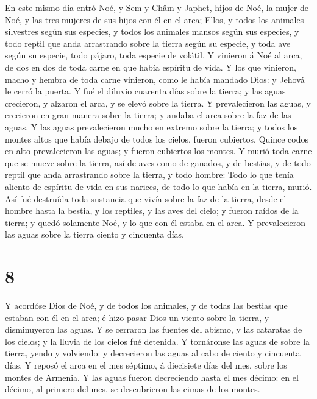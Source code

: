  En este mismo día entró Noé, y Sem y Châm y Japhet, hijos
de Noé, la mujer de Noé, y las tres mujeres de sus hijos con él en el
arca;  Ellos, y todos los animales silvestres según sus
especies, y todos los animales mansos según sus especies, y todo reptil
que anda arrastrando sobre la tierra según su especie, y toda ave según
su especie, todo pájaro, toda especie de volátil.  Y
vinieron á Noé al arca, de dos en dos de toda carne en que había
espíritu de vida.  Y los que vinieron, macho y hembra de
toda carne vinieron, como le había mandado Dios: y Jehová le cerró la
puerta.  Y fué el diluvio cuarenta días sobre la tierra; y
las aguas crecieron, y alzaron el arca, y se elevó sobre la tierra.
 Y prevalecieron las aguas, y crecieron en gran manera
sobre la tierra; y andaba el arca sobre la faz de las aguas.
 Y las aguas prevalecieron mucho en extremo sobre la
tierra; y todos los montes altos que había debajo de todos los cielos,
fueron cubiertos.  Quince codos en alto prevalecieron las
aguas; y fueron cubiertos los montes.  Y murió toda carne
que se mueve sobre la tierra, así de aves como de ganados, y de bestias,
y de todo reptil que anda arrastrando sobre la tierra, y todo hombre:
 Todo lo que tenía aliento de espíritu de vida en sus
narices, de todo lo que había en la tierra, murió.  Así fué
destruída toda sustancia que vivía sobre la faz de la tierra, desde el
hombre hasta la bestia, y los reptiles, y las aves del cielo; y fueron
raídos de la tierra; y quedó solamente Noé, y lo que con él estaba en el
arca.  Y prevalecieron las aguas sobre la tierra ciento y
cincuenta días.

\hypertarget{section-7}{%
\section{8}\label{section-7}}

 Y acordóse Dios de Noé, y de todos los animales, y de todas
las bestias que estaban con él en el arca; é hizo pasar Dios un viento
sobre la tierra, y disminuyeron las aguas.  Y se cerraron
las fuentes del abismo, y las cataratas de los cielos; y la lluvia de
los cielos fué detenida.  Y tornáronse las aguas de sobre la
tierra, yendo y volviendo: y decrecieron las aguas al cabo de ciento y
cincuenta días.  Y reposó el arca en el mes séptimo, á
diecisiete días del mes, sobre los montes de Armenia.  Y las
aguas fueron decreciendo hasta el mes décimo: en el décimo, al primero
del mes, se descubrieron las cimas de los montes.

